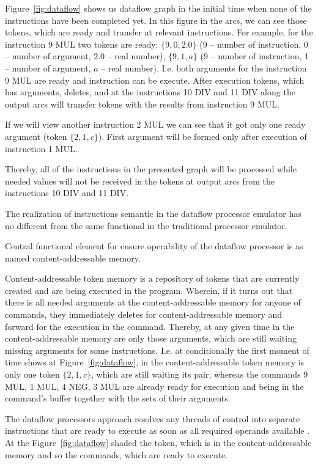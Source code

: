 \documentclass[
11pt,%
tightenlines,%
twoside,%
onecolumn,%
nofloats,%
nobibnotes,%
nofootinbib,%
superscriptaddress,%
noshowpacs,%
centertags]%
{revtex4}
\begin{document}
Figure~\ref{fig:dataflow} shows us dataflow graph in the initial time when none of the instructions have been completed yet.
In this figure in the arcs, we can see those tokens, which are ready and transfer at relevant instructions.
For example, for the instruction 9 MUL two tokens are ready: $\{9, 0, 2.0\}$ (9 -- number of instruction, 0 -- number of argument, 2.0 -- real number), $\{9, 1, a\}$ (9 -- number of instruction, 1 -- number of argument, $a$ -- real number).
I.e. both arguments for the instruction 9 MUL are ready and instruction can be execute.
After execution tokens, which has arguments, deletes, and at the instructions 10 DIV and 11 DIV along the output arcs will transfer tokens with the results from instruction 9 MUL.

If we will view another instruction 2 MUL we can see that it got only one ready argument (token $\{2, 1, c\}$).
First argument will be formed only after execution of instruction 1 MUL.

Thereby, all of the instructions in the presented graph will be processed while needed values will not be received in the tokens at output arcs from the instructions 10 DIV and 11 DIV.

The realization of instructions semantic in the dataflow processor emulator has no different from the same functional in the traditional processor emulator.

Central functional element for ensure operability of the dataflow processor is as named content-addressable memory.

Content-addressable token memory is a repository of tokens that are currently created and are being executed in the program.
Wherein, if it turns out that there is all needed arguments at the content-addressable memory for anyone of commands, they immediately deletes for content-addressable memory and forward for the execution in the command.
Thereby, at any given time in the content-addressable memory are only those arguments, which are still waiting missing arguments for some instructions.
I.e. at conditionally the first moment of time shows at Figure~\ref{fig:dataflow}, in the content-addressable token memory is only one token $\{2, 1, c\}$, which are still waiting its pair, whereas the commands 9 MUL, 1 MUL, 4 NEG, 3 MUL are already ready for execution and being in the command’s buffer together with the sets of their arguments.

The dataflow processors approach resolves any threads of control into separate instructions that are ready to execute as soon as all required operands available \cite{silc}. 
At the Figure~\ref{fig:dataflow} shaded the token, which is in the content-addressable memory and so the commands, which are ready to execute.
\end{document}
